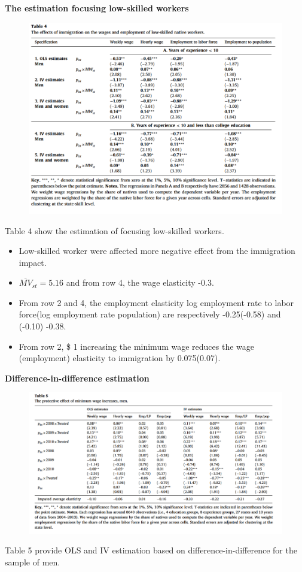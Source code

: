 \documentclass[../root]{subfiles}
\begin{document}
    {\bf The estimation focusing low-skilled workers}
    \begin{figure}[h]
        \includegraphics[width=12cm]{0612sugiyama/Table4.png}
    \end{figure}

    Table 4 show the estimation of focusing low-skilled workers.
    \begin{itemize}
        \item Low-skilled worker were affected more negative effect from the immigration impact.
        \item $\overline{MV}_{st}=5.16$ and from row 4,  the wage elasticity -0.3.
        \item From row 2 and 4, the employment elasticity log employment rate to labor force(log employment rate population) are respectively -0.25(-0.58) and (-0.10) -0.38.
        \item From row 2, \$ 1 increasing the minimum wage reduces the wage (employment) elasticity to immigration by 0.075(0.07).
    \end{itemize}
    
    {\bf Difference-in-difference estimation}
    \begin{figure}[h]
        \includegraphics[width=12cm]{0612sugiyama/Table5.png}
    \end{figure}
    Table 5 provide OLS and IV estimation based on difference-in-difference for the sample of men.
\end{document}
